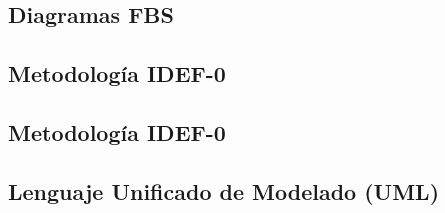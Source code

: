 \subsection{Diagramas FBS}

\subsection{Metodología IDEF-0}

\subsection{Metodología IDEF-0}

\subsection{Lenguaje Unificado de Modelado (UML)}
